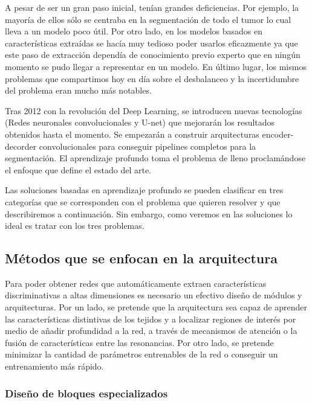 	A pesar de ser un gran paso inicial, tenían grandes deficiencias. Por ejemplo, la mayoría de ellos sólo se centraba en la segmentación de todo el tumor lo cual lleva a un modelo poco útil. Por otro lado, en los modelos basados en características extraídas se hacía muy tedioso poder usarlos eficazmente ya que este paso de extracción dependía de conocimiento previo experto que en ningún momento se pudo llegar a representar en un modelo. En último lugar, los mismos problemas que compartimos hoy en día sobre el desbalanceo y la incertidumbre del problema eran mucho más notables. 
	
	Tras 2012 con la revolución del Deep Learning, se introducen nuevas tecnologías (Redes neuronales convolucionales y U-net) que mejorarán los resultados obtenidos hasta el momento. 
	Se empezarán a construir arquitecturas encoder-decorder convolucionales para conseguir pipelines completos para la segmentación. El aprendizaje profundo toma el problema de lleno proclamándose el enfoque que define el estado del arte.
	
	Las soluciones basadas en aprendizaje profundo se pueden clasificar en tres categorías que se corresponden con el problema que quieren resolver y que describiremos  a continuación. Sin embargo, como veremos en las soluciones lo ideal es tratar con los tres problemas.
	\vspace{0.5cm}
	\subsection{Métodos que se enfocan en la arquitectura}
	\vspace{1cm}
		
		 Para poder obtener redes que automáticamente extraen características discriminativas a altas dimensiones es necesario un efectivo diseño de módulos y arquitecturas. Por un lado, se pretende que la arquitectura sea capaz de aprender las características distintivas de los tejidos y a localizar regiones de interés por medio de añadir profundidad a la red, a través de mecanismos de atención o la fusión de características entre las resonancias. Por otro lado, se pretende minimizar la cantidad de parámetros entrenables de la red o conseguir un entrenamiento más rápido.
		 \vspace{0.5cm}
		 
		\subsubsection{Diseño de bloques especializados}
			\vspace{0.5cm}
			
